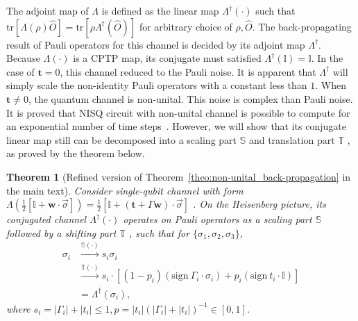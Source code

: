 \documentclass[aps,%
twocolumn,%
floatfix,%
pra,%
amsfonts,%
longbibliography,%
groupedaddress,%
superscriptaddress]{revtex4-2}%
\newtheorem{theorem}{Theorem}
\newcommand{\1}{\mathbbm{1}}
\begin{document}
The adjoint map of $\Lambda$ is defined as the linear map $\Lambda^\dagger(\cdot)$  such that $\text{tr}[\Lambda(\rho)\hat O] = \text{tr}[\rho\Lambda^\dagger(\hat O)]$ for arbitrary choice of $\rho, \hat O$.  The back-propagating result of Pauli operators for this channel is decided by its  adjoint map $\Lambda^\dagger$. Because $\Lambda(\cdot)$ is a CPTP map, its conjugate must satisfied $\Lambda^\dagger(\mathbb{I}) =\mathbb{I} $. 
In the case of $\mathbf{t} = 0$, this channel reduced to the Pauli noise.  It is apparent that $\Lambda^\dagger$ will simply scale the non-identity Pauli operators with a constant less than $1$.
When \(\mathbf{t} \neq 0\), the quantum channel is non-unital. This noise is complex than Pauli noise. It is proved that NISQ circuit with non-unital channel is possible to compute for an exponential number of time steps~\cite{ben2013quantum}. 
However, we will show that its conjugate linear map still can be decomposed into a scaling part $\mathbb{S}$ and translation part $\mathbb{T}$ , as proved by the theorem below.
\begin{theorem}[Refined version of Theorem~\ref{theo:non-unital_back-propagation} in the main text]
\label{theo:non-unital_back-propagation_proof}
   Consider single-qubit channel with form \(\Lambda\left(\frac{1}{2}[\mathbb{I} + \mathbf{w} \cdot  \vec\sigma]\right) = \frac{1}{2}[\mathbb{I} + (\mathbf{t} + \Gamma\mathbf{w}) \cdot  \vec\sigma]\) . On the Heisenberg picture, its conjugated channel $\Lambda^\dagger(\cdot)$ operates on Pauli operators as a scaling part $\mathbb{S}$ followed by a shifting part $\mathbb{T}$ , such that for $\{\sigma_1,\sigma_2,\sigma_3\}$,
   \begin{align}
       \sigma_i &\xrightarrow{\mathbb{S}(\cdot)} s_i \sigma_i\\
       &\xrightarrow{\mathbb{T}(\cdot)} s_i\cdot \left[(1 - p_i)(\text{sign}~\Gamma_i \cdot \sigma_i) + p_i(\text{sign}~t_i\cdot\mathbb{I})\right]\\
       &= \Lambda^\dagger(\sigma_i),
   \end{align}
   where $s_i = |\Gamma_i| + |t_i| \leq 1, p = {|t_i|}{(|\Gamma_i| + |t_i|)}^{-1} \in [0,1]$. 
\end{theorem}
\end{document}
